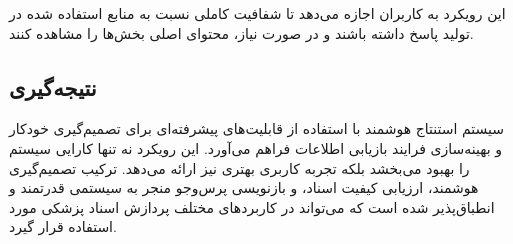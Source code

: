 این رویکرد به کاربران اجازه می‌دهد تا شفافیت کاملی نسبت به منابع استفاده شده در تولید پاسخ داشته باشند و در صورت نیاز، محتوای اصلی بخش‌ها را مشاهده کنند.

\subsection{نتیجه‌گیری}
سیستم استنتاج هوشمند  با استفاده از  قابلیت‌های پیشرفته‌ای برای تصمیم‌گیری خودکار و بهینه‌سازی فرایند بازیابی اطلاعات فراهم می‌آورد. این رویکرد نه تنها کارایی سیستم را بهبود می‌بخشد بلکه تجربه کاربری بهتری نیز ارائه می‌دهد. ترکیب تصمیم‌گیری هوشمند، ارزیابی کیفیت اسناد، و بازنویسی پرس‌وجو منجر به سیستمی قدرتمند و انطباق‌پذیر شده است که می‌تواند در کاربردهای مختلف پردازش اسناد پزشکی مورد استفاده قرار گیرد.

